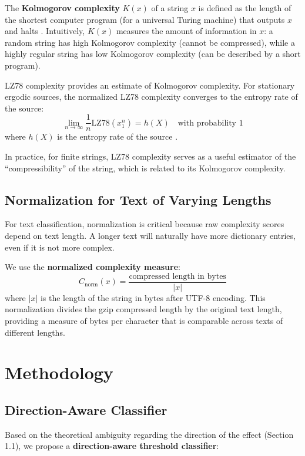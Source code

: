 \documentclass[11pt,letterpaper]{article}
\begin{document}
The \textbf{Kolmogorov complexity} $K(x)$ of a string $x$ is defined as the length of the shortest computer program (for a universal Turing machine) that outputs $x$ and halts \cite{Li2008}. Intuitively, $K(x)$ measures the amount of information in $x$: a random string has high Kolmogorov complexity (cannot be compressed), while a highly regular string has low Kolmogorov complexity (can be described by a short program).

LZ78 complexity provides an estimate of Kolmogorov complexity. For stationary ergodic sources, the normalized LZ78 complexity converges to the entropy rate of the source:
\[
\lim_{n \to \infty} \frac{1}{n} \text{LZ78}(x_1^n) = h(X) \quad \text{with probability 1}
\]
where $h(X)$ is the entropy rate of the source \cite{Ziv1978}.

In practice, for finite strings, LZ78 complexity serves as a useful estimator of the ``compressibility'' of the string, which is related to its Kolmogorov complexity.

\subsection{Normalization for Text of Varying Lengths}

For text classification, normalization is critical because raw complexity scores depend on text length. A longer text will naturally have more dictionary entries, even if it is not more complex.

We use the \textbf{normalized complexity measure}:
\[
C_{\text{norm}}(x) = \frac{\text{compressed length in bytes}}{|x|}
\]
where $|x|$ is the length of the string in bytes after UTF-8 encoding. This normalization divides the gzip compressed length by the original text length, providing a measure of bytes per character that is comparable across texts of different lengths.

\section{Methodology}

\subsection{Direction-Aware Classifier}

Based on the theoretical ambiguity regarding the direction of the effect (Section 1.1), we propose a \textbf{direction-aware threshold classifier}:
\end{document}
